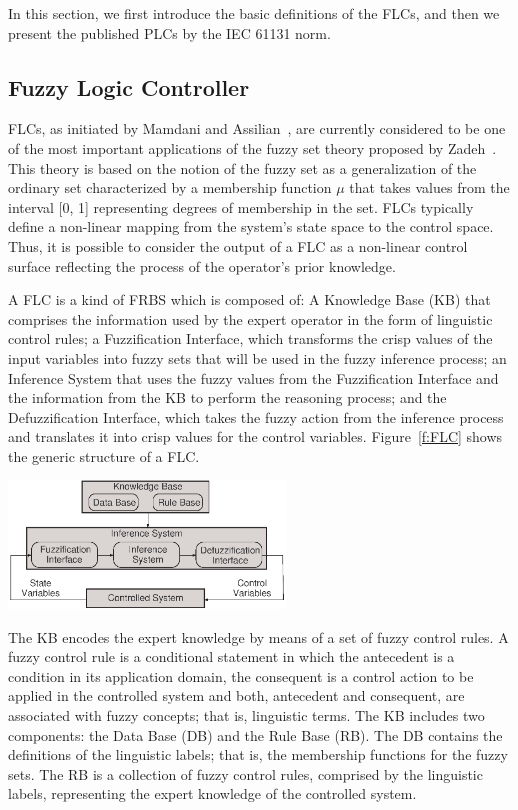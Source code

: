 \documentclass[11pt,twoside]{article}
\begin{document}
\begin{multicols}{2}
In this section, we first introduce the basic definitions of the FLCs, and then we present the published PLCs by the IEC 61131 norm.


\subsection{Fuzzy Logic Controller}

FLCs, as initiated by Mamdani and Assilian~\cite{Mamdani1974,MA1975}, are currently considered to be one of the most important applications of the fuzzy set theory proposed by Zadeh~\cite{Zadeh1965}. This theory is based on the notion of the fuzzy set as a generalization of the ordinary set characterized by a membership function $\mu$ that takes values from the interval [0, 1] representing degrees of membership in the set. FLCs typically define a non-linear mapping from the system’s state space to the control space. Thus, it is possible to consider the output of a FLC as a non-linear control surface reflecting the process of the operator's prior knowledge.

A FLC is a kind of FRBS which is composed of: A Knowledge Base (KB) that comprises the information used by the expert operator in the form of linguistic control rules; a Fuzzification Interface, which transforms the crisp values of the input variables into fuzzy sets that will be used in the fuzzy inference process; an Inference System that uses the fuzzy values from the Fuzzification Interface and the information from the KB to perform the reasoning process; and the Defuzzification Interface, which takes the fuzzy action from the inference process and translates it into crisp values for the control variables. Figure~\ref{f:FLC} shows the generic structure of a FLC.

\vspace*{7pt}
\centerline{\includegraphics[width=2.9in]{./figs/FRBS-mam.eps}}
\vspace*{3pt}
\label{f:FLC}
\vspace*{5pt}

The KB encodes the expert knowledge by means of a set of fuzzy control rules. A fuzzy control rule is a conditional statement in which the antecedent is a condition in its application domain, the consequent is a control action to be applied in the controlled system and both, antecedent and consequent, are associated with fuzzy concepts; that is, linguistic terms. The KB includes two components: the Data Base (DB) and the Rule Base (RB). The DB contains the definitions of the linguistic labels; that is, the membership functions for the fuzzy sets. The RB is a collection of fuzzy control rules, comprised by the linguistic labels, representing the expert knowledge of the controlled system.


\end{multicols}
\end{document}
